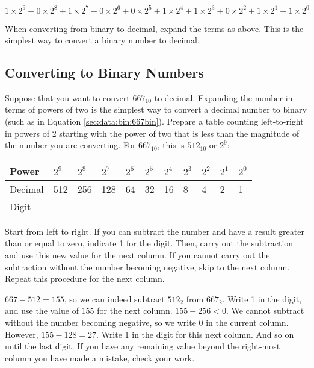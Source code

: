 \documentclass[11pt]{book}
\begin{document}
\begin{equation}\label{sec:data:bin:667bin}
	1 \times 2^9 + 0 \times 2^8 + 1 \times 2^7 + 0 \times 2^6 + 0 \times 2^5 + 1 \times 2^4 + 1 \times 2^3 + 0 \times 2^2 + 1 \times 2^1 + 1 \times 2^0
\end{equation}

When converting from binary to decimal, expand the terms as above. This is the simplest way to convert a binary number to decimal.

\subsection{Converting to Binary Numbers\label{sec:data:bin:bin}}

Suppose that you want to convert $667_{10}$ to decimal. Expanding the number in terms of powers of two is the simplest way to convert a decimal number to binary (such as in Equation \ref{sec:data:bin:667bin}). Prepare a table counting left-to-right in powers of 2 starting with the power of two that is less than the magnitude of the number you are converting. For $667_{10}$, this is $512_{10}$ or $2^9$:

\vspace{1em}
\begin{tabular}{|l|l|l|l|l|l|l|l|l|l|l|}\hline
Power & $2^9$ & $2^8$ & $2^7$ & $2^6$ & $2^5$ & $2^4$ & $2^3$ & $2^2$ & $2^1$ & $2^0$ \\\hline\hline
Decimal & 512 & 256 & 128 & 64 & 32 & 16 & 8 & 4 & 2 & 1 \\\hline
Digit &  &  &  &  &  &  &  &  &  &  \\\hline
\end{tabular}

\vspace{1em}
Start from left to right. If you can subtract the number and have a result greater than or equal to zero, indicate 1 for the digit. Then, carry out the subtraction and use this new value for the next column. If you cannot carry out the subtraction without the number becoming negative, skip to the next column. Repeat this procedure for the next column.

 $667-512=155$, so we can indeed subtract $512_2$ from $667_2$. Write 1 in the digit, and use the value of $155$ for the next column. $155-256<0$. We cannot subtract without the number becoming negative, so we write 0 in the current column. However, $155-128=27$. Write 1 in the digit for this next column. And so on until the last digit. If you have any remaining value beyond the right-most column you have made a mistake, check your work.
\end{document}
